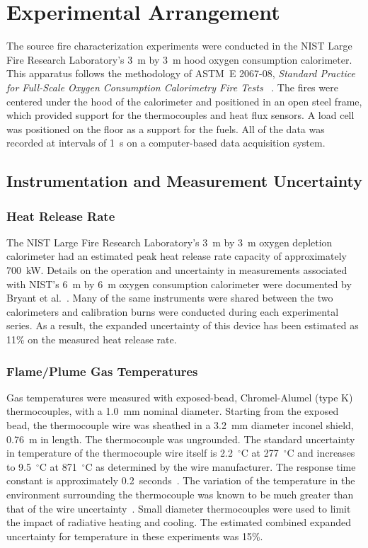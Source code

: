 \documentclass[twoside]{uocthesis}
\begin{document}
{\section{Experimental Arrangement}

The source fire characterization experiments were conducted in the NIST Large Fire Research Laboratory's 3~m by 3~m hood oxygen consumption calorimeter. This apparatus follows the methodology of ASTM~E 2067-08, {\em Standard Practice for Full-Scale Oxygen Consumption Calorimetry Fire Tests} ~\cite{ASTM_E2067}. The fires were centered under the hood of the calorimeter and positioned in an open steel frame, which provided support for the thermocouples and heat flux sensors. A load cell was positioned on the floor as a support for the fuels.  All of the data was recorded at intervals of 1~s on a computer-based data acquisition system.

\subsection{Instrumentation and Measurement Uncertainty}

\subsubsection{Heat Release Rate}

The NIST Large Fire Research Laboratory's 3~m by 3~m oxygen depletion calorimeter had an estimated peak heat release rate capacity of approximately 700~kW.  Details on the operation and uncertainty in measurements associated with NIST's 6~m by 6~m oxygen consumption calorimeter were documented by Bryant et al.~\cite{Bryant:2004}. Many of the same instruments were shared between the two calorimeters and calibration burns were conducted during each experimental series.  As a result, the expanded uncertainty of this device has been estimated as 11\% on the measured heat release rate.

\subsubsection{Flame/Plume Gas Temperatures}

Gas temperatures were measured with exposed-bead, Chromel-Alumel (type K) thermocouples, with a 1.0~mm nominal diameter.  Starting from the exposed bead, the thermocouple wire was sheathed in a 3.2~mm diameter inconel shield, 0.76~m in length. The thermocouple was ungrounded. The standard uncertainty in temperature of the thermocouple wire itself is 2.2~$^\circ$C at 277~$^\circ$C and increases to 9.5~$^\circ$C at 871~$^\circ$C as determined by the wire manufacturer.  The response time constant is approximately 0.2~seconds~\cite{Omega}.  The variation of the temperature in the environment surrounding the thermocouple was known to be much greater than that of the wire uncertainty~\cite{Blevins:1999,Pitts:2001}. Small diameter thermocouples were used to limit the impact of radiative heating and cooling.  The estimated combined expanded uncertainty for temperature in these experiments was 15\%.

}
\end{document}
